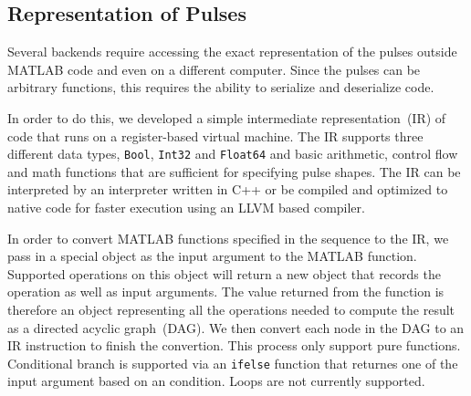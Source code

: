 \subsection{Representation of Pulses}
\label{ch:computer-control:backend:pulse-repr}
Several backends require accessing the exact representation of the pulses
outside MATLAB code and even on a different computer.
Since the pulses can be arbitrary functions,
this requires the ability to serialize and deserialize code.

In order to do this, we developed a simple intermediate representation~(IR)
of code that runs on a register-based virtual machine.
The IR supports three different data types, \verb`Bool`, \verb`Int32` and \verb`Float64`
and basic arithmetic, control flow and math functions
that are sufficient for specifying pulse shapes.
The IR can be interpreted by an interpreter written in C++ or
be compiled and optimized to native code for faster execution using an LLVM based compiler.

In order to convert MATLAB functions specified in the sequence to the IR,
we pass in a special object as the input argument to the MATLAB function.
Supported operations on this object will return a new object
that records the operation as well as input arguments.
The value returned from the function is therefore an object representing
all the operations needed to compute the result as a directed acyclic graph~(DAG).
We then convert each node in the DAG to an IR instruction to finish the convertion.
This process only support pure functions.
Conditional branch is supported via an \verb`ifelse` function
that returnes one of the input argument based on an condition.
Loops are not currently supported.

